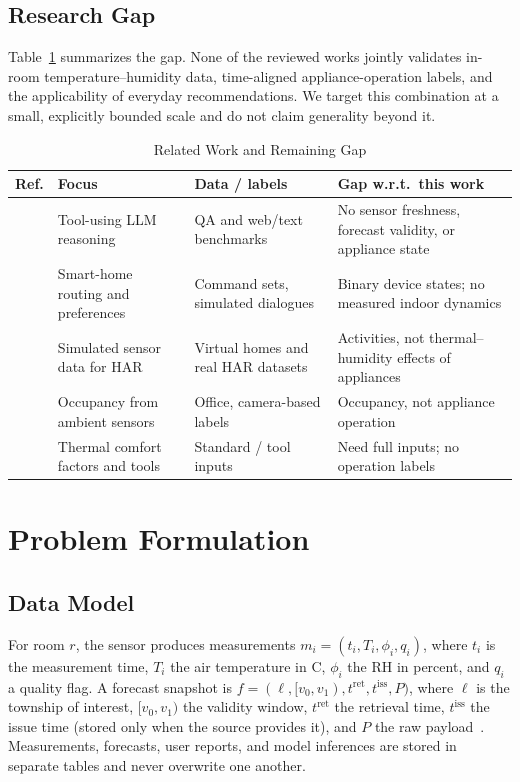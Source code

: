 \documentclass[conference]{IEEEtran}
\begin{document}
\subsection{Research Gap}
Table~\ref{tab:related} summarizes the gap. None of the reviewed works jointly validates in-room temperature--humidity data, time-aligned appliance-operation labels, and the applicability of everyday recommendations. We target this combination at a small, explicitly bounded scale and do not claim generality beyond it.

\begin{table}[t]
\caption{Related Work and Remaining Gap}
\label{tab:related}
\centering
\footnotesize
\setlength{\tabcolsep}{3pt}
\begin{tabular}{@{}>{\raggedright}p{0.9cm}>{\raggedright}p{2.15cm}>{\raggedright}p{2.0cm}>{\raggedright\arraybackslash}p{2.95cm}@{}}
\toprule
Ref. & Focus & Data / labels & Gap w.r.t.\ this work \\
\midrule
\cite{yao2023react,schick2023toolformer} & Tool-using LLM reasoning & QA and web/text benchmarks & No sensor freshness, forecast validity, or appliance state \\
\cite{lim2026adahome} & Smart-home routing and preferences & Command sets, simulated dialogues & Binary device states; no measured indoor dynamics \\
\cite{leng2025agentsense} & Simulated sensor data for HAR & Virtual homes and real HAR datasets & Activities, not thermal--humidity effects of appliances \\
\cite{candanedo2016occupancy} & Occupancy from ambient sensors & Office, camera-based labels & Occupancy, not appliance operation \\
\cite{ashrae55,mishra2026myths,tartarini2020cbe} & Thermal comfort factors and tools & Standard / tool inputs & Need full inputs; no operation labels \\
\bottomrule
\end{tabular}
\end{table}

\section{Problem Formulation}
\subsection{Data Model}
For room $r$, the sensor produces measurements
$m_i=(t_i, T_i, \phi_i, q_i)$, where $t_i$ is the measurement time, $T_i$ the air temperature in \textdegree C, $\phi_i$ the RH in percent, and $q_i$ a quality flag. A forecast snapshot is
$f=(\ell, [v_0, v_1), t^{\mathrm{ret}}, t^{\mathrm{iss}}, P)$, where $\ell$ is the township of interest, $[v_0,v_1)$ the validity window, $t^{\mathrm{ret}}$ the retrieval time, $t^{\mathrm{iss}}$ the issue time (stored only when the source provides it), and $P$ the raw payload~\cite{cwa_township,cwa_api}. Measurements, forecasts, user reports, and model inferences are stored in separate tables and never overwrite one another.
\end{document}
